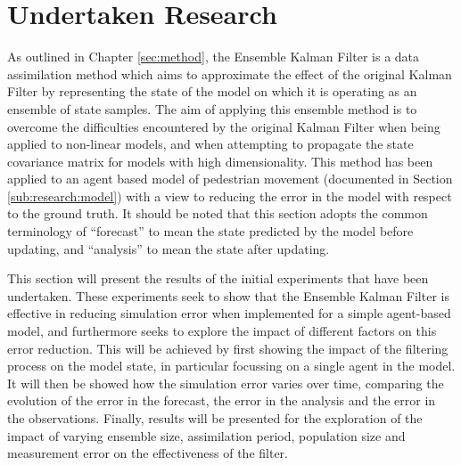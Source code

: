 \section{Undertaken Research}\label{sec:research}



As outlined in Chapter \ref{sec:method}, the Ensemble Kalman Filter is a data
assimilation method which aims to approximate the effect of the original Kalman
Filter by representing the state of the model on which it is operating as an
ensemble of state samples.
The aim of applying this ensemble method is to overcome the difficulties
encountered by the original Kalman Filter when being applied to non-linear
models, and when attempting to propagate the state covariance matrix for models
with high dimensionality.
This method has been applied to an agent based model of pedestrian movement
(documented in Section \ref{sub:research:model}) with a view to reducing the error
in the model with respect to the ground truth.
It should be noted that this section adopts the common terminology of
``forecast'' to mean the state predicted by the model before updating, and
``analysis'' to mean the state after updating.

This section will present the results of the initial experiments that have been
undertaken.
These experiments seek to show that the Ensemble Kalman Filter is effective in
reducing simulation error when implemented for a simple agent-based model, and
furthermore seeks to explore the impact of different factors on this error
reduction.
This will be achieved by first showing the impact of the filtering process on
the model state, in particular focussing on a single agent in the model.
It will then be showed how the simulation error varies over time, comparing the
evolution of the error in the forecast, the error in the analysis and the error
in the observations.
Finally, results will be presented for the exploration of the impact of varying
ensemble size, assimilation period, population size and measurement error on the
effectiveness of the filter.

